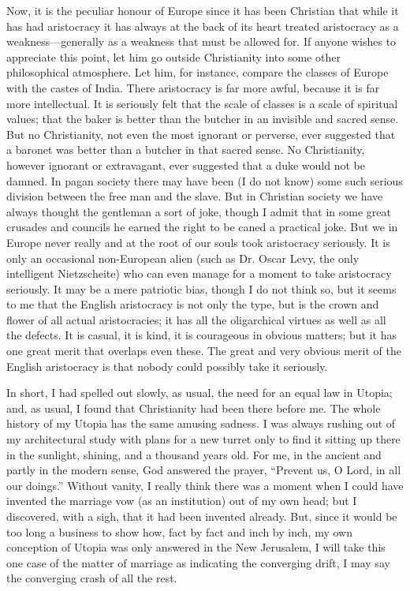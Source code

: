 \documentclass{book}
\begin{document}
Now, it is the peculiar honour of Europe since it has been Christian that while it has had aristocracy it has always at the back of its heart treated aristocracy as a weakness—generally as a weakness that must be allowed for. If anyone wishes to appreciate this point, let him go outside Christianity into some other philosophical atmosphere. Let him, for instance, compare the classes of Europe with the castes of India. There aristocracy is far more awful, because it is far more intellectual. It is seriously felt that the scale of classes is a scale of spiritual values; that the baker is better than the butcher in an invisible and sacred sense. But no Christianity, not even the most ignorant or perverse, ever suggested that a baronet was better than a butcher in that sacred sense. No Christianity, however ignorant or extravagant, ever suggested that a duke would not be damned. In pagan society there may have been (I do not know) some such serious division between the free man and the slave. But in Christian society we have always thought the gentleman a sort of joke, though I admit that in some great crusades and councils he earned the right to be caned a practical joke. But we in Europe never really and at the root of our souls took aristocracy seriously. It is only an occasional non-European alien (such as Dr. Oscar Levy, the only intelligent Nietzscheite) who can even manage for a moment to take aristocracy seriously. It may be a mere patriotic bias, though I do not think so, but it seems to me that the English aristocracy is not only the type, but is the crown and flower of all actual aristocracies; it has all the oligarchical virtues as well as all the defects. It is casual, it is kind, it is courageous in obvious matters; but it has one great merit that overlaps even these. The great and very obvious merit of the English aristocracy is that nobody could possibly take it seriously.

In short, I had spelled out slowly, as usual, the need for an equal law in Utopia; and, as usual, I found that Christianity had been there before me. The whole history of my Utopia has the same amusing sadness. I was always rushing out of my architectural study with plans for a new turret only to find it sitting up there in the sunlight, shining, and a thousand years old. For me, in the ancient and partly in the modern sense, God answered the prayer, “Prevent us, O Lord, in all our doings.” Without vanity, I really think there was a moment when I could have invented the marriage vow (as an institution) out of my own head; but I discovered, with a sigh, that it had been invented already. But, since it would be too long a business to show how, fact by fact and inch by inch, my own conception of Utopia was only answered in the New Jerusalem, I will take this one case of the matter of marriage as indicating the converging drift, I may say the converging crash of all the rest.
\end{document}
